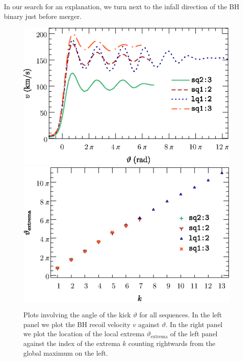 \documentclass[floats,floatfix,showpacs,amssymb,physrev,twocolumn,superscriptaddress,reprint,
nofootinbib, longbibliography]{revtex4-2}
\newcounter{count}
\begin{document}
In our search for an explanation, we turn next to the infall direction
of the BH binary just before merger.
%
%
\begin{figure}[t]
    \subfloat%
    {
    \includegraphics[width=\columnwidth]{kick-theta.eps}
    \label{fig:kick-theta}
    }
    \hfill
    \subfloat%
    {
    \includegraphics[width=\columnwidth]{theta-extrema.eps}
    \label{fig:theta-extrema}
    }
    \caption{
    Plots involving the angle of the kick $\vartheta$ for 
    all sequences. In the left panel we plot the BH recoil 
    velocity $v$ against $\vartheta$. In the right panel we plot the location of the local extrema $\vartheta_\text{extrema}$ 
    of the left panel against the index of the extrema $k$ counting rightwards from
    the global maximum on the left.
    }
    \label{fig:theta-plots}
\end{figure}
\end{document}
